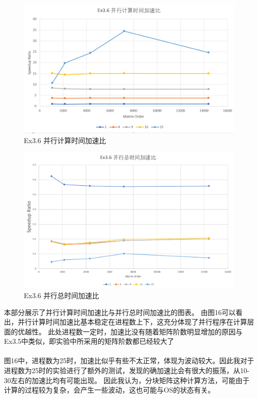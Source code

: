 \documentclass[UTF8]{article}
\begin{document}
                \begin{figure}[h]
                    \includegraphics[width=\textwidth]{36pct.png}
                    \caption{Ex3.6 并行计算时间加速比}
                \end{figure}
                \begin{figure}[h]
                    \includegraphics[width=\textwidth]{36pat.png}
                    \caption{Ex3.6 并行总时间加速比}
                \end{figure}

        本部分展示了并行计算时间加速比与并行总时间加速比的图表。
        由图16可以看出，并行计算时间加速比基本稳定在进程数上下，这充分体现了并行程序在计算层面的优越性。
        此处进程数一定时，加速比没有随着矩阵阶数明显增加的原因与Ex3.5中类似，即实验中所采用的矩阵阶数都已经较大了\\\\
        
        图16中，进程数为25时，加速比似乎有些不太正常，体现为波动较大。因此我对于进程数为25时的实验进行了额外的测试，发现的确加速比会有很大的振荡，从10-30左右的加速比均有可能出现。
        因此我认为，分块矩阵这种计算方法，可能由于计算的过程较为复杂，会产生一些波动，这也可能与OS的状态有关。\\\\
    
\end{document}
